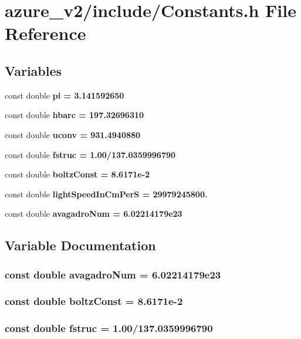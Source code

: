 \section{azure\_\-v2/include/Constants.h File Reference}
\label{Constants_8h}
\subsection*{Variables}
\begin{CompactItemize}
\item 
const double \bf{pi} = 3.141592650
\item 
const double \bf{hbarc} = 197.32696310
\item 
const double \bf{uconv} = 931.4940880
\item 
const double \bf{fstruc} = 1.00/137.0359996790
\item 
const double \bf{boltz\-Const} = 8.6171e-2
\item 
const double \bf{light\-Speed\-In\-Cm\-Per\-S} = 29979245800.
\item 
const double \bf{avagadro\-Num} = 6.02214179e23
\end{CompactItemize}


\subsection{Variable Documentation}
\subsubsection{\setlength{\rightskip}{0pt plus 5cm}const double \bf{avagadro\-Num} = 6.02214179e23}\label{Constants_8h_9dd125e58e2c72e18e149409242f8895}


\subsubsection{\setlength{\rightskip}{0pt plus 5cm}const double \bf{boltz\-Const} = 8.6171e-2}\label{Constants_8h_8013795ea203953003aee9004ad99fdc}


\subsubsection{\setlength{\rightskip}{0pt plus 5cm}const double \bf{fstruc} = 1.00/137.0359996790}\label{Constants_8h_0291ffd484bcaa07ff3a7347f016a0a2}


